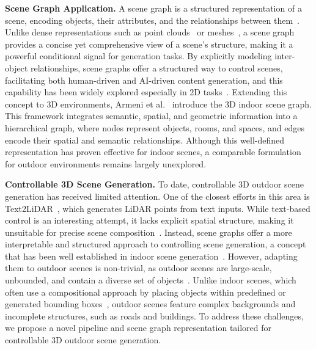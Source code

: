 \noindent \textbf{Scene Graph Application.} 
A scene graph is a structured representation of a scene, encoding objects, their attributes, and the relationships between them~\cite{Johnson_2015_CVPR}. 
%
Unlike dense representations such as point clouds~\cite{qi2017pointnet++,li2025deephierarchicallearningfor3dsemanticsegmentation,li2024enhancing} or meshes~\cite{chang2015shapenet}, a scene graph provides a concise yet comprehensive view of a scene’s structure, making it a powerful conditional signal for generation tasks. 
%
By explicitly modeling inter-object relationships, scene graphs offer a structured way to control scenes, facilitating both human-driven and AI-driven content generation, and this capability has been widely explored especially in 2D tasks~\cite{SonSGpami2023, Liu2024R3CDSG, yang2022dbsgi, Yang_2019_CVPR, XU2019477, vcg2021tmm, johnson2018image, farshad2023scenegenie}. 
%
Extending this concept to 3D environments, Armeni et al.~\cite{armeni_iccv19} introduce the 3D indoor scene graph. This framework integrates semantic, spatial, and geometric information into a hierarchical graph, where nodes represent objects, rooms, and spaces, and edges encode their spatial and semantic relationships. Although this well-defined representation has proven effective for indoor scenes, a comparable formulation for outdoor environments remains largely unexplored.

\noindent \textbf{Controllable 3D Scene Generation.} 
%
To date, controllable 3D outdoor scene generation has received limited attention. One of the closest efforts in this area is Text2LiDAR~\cite{wu2024text2lidar}, which generates LiDAR points from text inputs.
%
While text-based control is an interesting attempt, it lacks explicit spatial structure, making it unsuitable for precise scene composition~\cite{zhang2023adding}.
%
Instead, scene graphs offer a more interpretable and structured approach to controlling scene generation, a concept that has been well established in indoor scene generation~\cite{lin2024instructscene, tang2024diffuscene, zhou2019scenegraphnet, li2019grains, wang2021sceneformer}. 
%
However, adapting them to outdoor scenes is non-trivial, as outdoor scenes are large-scale, unbounded, and contain a diverse set of objects~\cite{xie2025citydreamer4dcompositionalgenerativemodel}. 
%
Unlike indoor scenes, which often use a compositional approach by placing objects within predefined or generated bounding boxes~\cite{zhai2025echoscene, zhai2023commonscenes, dhamo2021graph, wang2019planit, para2021generative}, outdoor scenes feature complex backgrounds and incomplete structures, such as roads and buildings.
%
To address these challenges, we propose a novel pipeline and scene graph representation tailored for controllable 3D outdoor scene generation.







